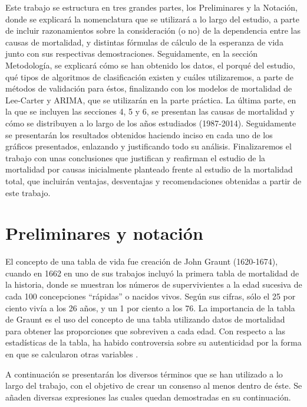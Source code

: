 \documentclass{article}
\begin{document}
Este trabajo se estructura en tres grandes partes, los Preliminares y la Notación, donde se explicará la nomenclatura que se utilizará a lo largo del estudio, a parte de incluir razonamientos sobre la consideración (o no) de la dependencia entre las causas de mortalidad, y distintas fórmulas de cálculo de la esperanza de vida junto con sus respectivas demostraciones. Seguidamente, en la sección Metodología, se explicará cómo se han obtenido los datos, el porqué del estudio, qué tipos de algoritmos de clasificación existen y cuáles utilizaremos, a parte de métodos de validación para éstos, finalizando con los modelos de mortalidad de Lee-Carter y ARIMA, que se utilizarán en la parte práctica. La última parte, en la que se incluyen las secciones 4, 5 y 6, se presentan las causas de mortalidad y cómo se distribuyen a lo largo de los años estudiados (1987-2014). Seguidamente se presentarán los resultados obtenidos haciendo inciso en cada uno de los gráficos presentados, enlazando y justificando todo su análisis. Finalizaremos el trabajo con unas conclusiones que justifican y reafirman el estudio de la mortalidad por causas inicialmente planteado frente al estudio de la mortalidad total, que incluirán ventajas, desventajas y recomendaciones obtenidas a partir de este trabajo.

\newpage
\section{Preliminares y notación}

El concepto de una tabla de vida fue creación de John Graunt (1620-1674), cuando en 1662 en uno de sus trabajos incluyó la primera tabla de mortalidad de la historia, donde se muestran los números de supervivientes a la edad sucesiva de cada 100 concepciones ``rápidas'' o nacidos vivos. Según sus cifras, sólo el 25 por ciento vivía a los 26 años, y un 1 por ciento a los 76.
La importancia de la tabla de Graunt es el uso del concepto de una tabla utilizando datos de mortalidad para obtener las proporciones que sobreviven a cada edad. Con respecto a las estadísticas de la tabla, ha habido controversia sobre su autenticidad por la forma en que se calcularon otras variables \cite{rowland2003demographic}.

A continuación se presentarán los diversos términos que se han utilizado a lo largo del trabajo, con el objetivo de crear un consenso al menos dentro de éste. Se añaden diversas expresiones las cuales quedan demostradas en su continuación.
\end{document}
